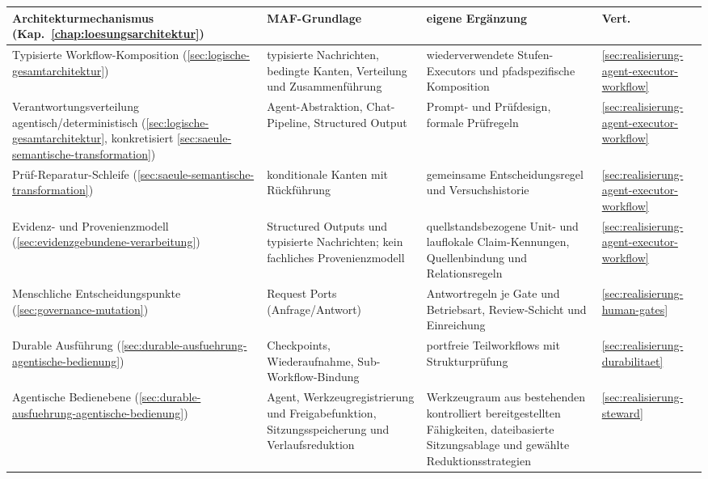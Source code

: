 \begin{table}[!htb]
  \centering
  \small
  \begin{tabular}{p{}p{}p{}p{}}
    \hline
    \textbf{Architekturmechanismus (Kap.~\ref{chap:loesungsarchitektur})} & \textbf{MAF-Grundlage} &
    \textbf{eigene Ergänzung} & \textbf{Vert.} \\
    \hline
    Typisierte Workflow-Komposition (\ref{sec:logische-gesamtarchitektur}) &
    typisierte Nachrichten, bedingte Kanten,
    Verteilung und Zusammenführung &
    wiederverwendete Stufen-Executors und pfadspezifische Komposition & \ref{sec:realisierung-agent-executor-workflow} \\
    Verantwortungsverteilung agentisch/deterministisch (\ref{sec:logische-gesamtarchitektur}, konkretisiert \ref{sec:saeule-semantische-transformation}) &
    Agent-Abstraktion, Chat-Pipeline, Structured Output &
    Prompt- und Prüfdesign, formale Prüfregeln & \ref{sec:realisierung-agent-executor-workflow} \\
    Prüf-Reparatur-Schleife (\ref{sec:saeule-semantische-transformation}) &
    konditionale Kanten mit Rückführung &
    gemeinsame Entscheidungsregel und Versuchshistorie & \ref{sec:realisierung-agent-executor-workflow} \\
    Evidenz- und Provenienzmodell (\ref{sec:evidenzgebundene-verarbeitung}) &
    Structured Outputs und typisierte Nachrichten; kein fachliches
    Provenienzmodell &
    quellstandsbezogene Unit- und lauflokale Claim-Kennungen,
    Quellenbindung und Relationsregeln & \ref{sec:realisierung-agent-executor-workflow} \\
    Menschliche Entscheidungspunkte (\ref{sec:governance-mutation}) &
    Request Ports (Anfrage/Antwort) &
    Antwortregeln je Gate und Betriebsart,
    Review-Schicht und Einreichung & \ref{sec:realisierung-human-gates} \\
    Durable Ausführung (\ref{sec:durable-ausfuehrung-agentische-bedienung}) &
    Checkpoints, Wiederaufnahme, Sub-Workflow-Bindung &
    portfreie Teilworkflows mit Strukturprüfung & \ref{sec:realisierung-durabilitaet} \\
    Agentische Bedienebene (\ref{sec:durable-ausfuehrung-agentische-bedienung}) &
    Agent, Werkzeugregistrierung und Freigabefunktion,
    Sitzungsspeicherung und Verlaufsreduktion &
    Werkzeugraum aus bestehenden kontrolliert bereitgestellten
    Fähigkeiten, dateibasierte Sitzungsablage und gewählte
    Reduktionsstrategien &
    \ref{sec:realisierung-steward} \\

\end{tabular}
\end{table}
